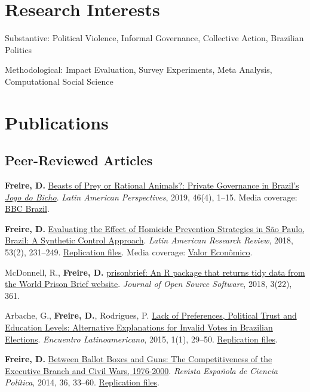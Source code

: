 \documentclass[a4paper]{article}
\renewenvironment{itemize}{
  \begin{list}{}{
    \setlength{\leftmargin}{1.5em}
  }
}{
  \end{list}
}
\begin{document}
\section*{Research Interests}

\begin{itemize}
 	\item Substantive: Political Violence, Informal Governance, Collective Action, Brazilian Politics %
 	\item Methodological: Impact Evaluation, Survey Experiments, Meta Analysis, Computational Social Science 
\end{itemize}

\section*{Publications}

\subsection*{Peer-Reviewed Articles}

\begin{itemize}
	\item \textbf{Freire, D.} \href{https://doi.org/10.1177/0094582X19846519}{Beasts of Prey or Rational Animals?: Private Governance in Brazil's \emph{Jogo do Bicho}}. \textit{Latin American Perspectives}, 2019, 46(4), 1--15. Media coverage: \href{http://www.bbc.com/portuguese/brasil-40140693}{BBC Brazil}.
	\item \textbf{Freire, D.} \href{https://larrlasa.org/articles/10.25222/larr.334/}{Evaluating the Effect of Homicide Prevention Strategies in São Paulo, Brazil: A Synthetic Control Approach}. \textit{Latin American Research Review}, 2018, 53(2), 231--249. \href{https://github.com/danilofreire/homicides-sp-synth}{Replication files}. Media coverage: \href{http://www.valor.com.br/cultura/5111524/sangue-no-asfalto}{Valor Econômico}.
	\item McDonnell, R., \textbf{Freire, D.} \href{https://doi.org/10.21105/joss.00361}{prisonbrief: An R package that returns tidy data from the World Prison Brief website}. \textit{Journal of Open Source Software}, 2018, 3(22), 361. 
	\item Arbache, G., \textbf{Freire, D.}, Rodrigues, P. \href{http://www.iapss.org/wp-content/uploads/2014/10/ELA1.1_2.Lack-of-Preferences-Political-Trust-and-Education-Levels.pdf}{Lack of Preferences, Political Trust and Education Levels: Alternative Explanations for Invalid Votes in Brazilian Elections}. \textit{Encuentro Latinoamericano}, 2015, 1(1), 29--50. \href{https://github.com/danilofreire/invalid-votes-brazil}{Replication files}.
	\item \textbf{Freire, D.} \href{http://recyt.fecyt.es/index.php/recp/article/view/37638}{Between Ballot Boxes and Guns: The Competitiveness of the Executive Branch and Civil Wars, 1976-2000}. \textit{Revista Espa\~{n}ola de Ciencia Pol\'{i}tica}, 2014, 36, 33--60. \href{https://doi.org/10.7910/DVN/NSDUYG}{Replication files}.
\end{itemize}
\end{document}
